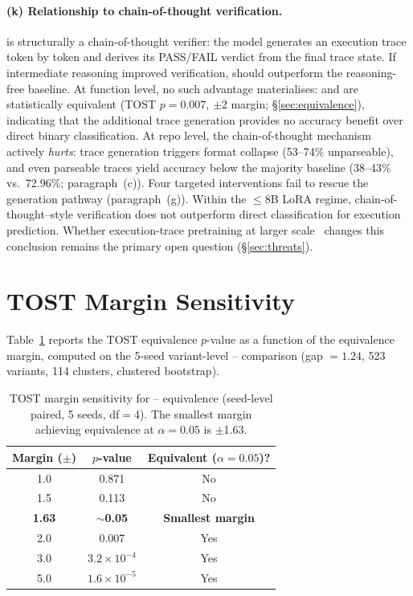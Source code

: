 \paragraph{(k) Relationship to chain-of-thought verification.}
\cwm{} is structurally a chain-of-thought verifier: the model generates an execution trace token by token and derives its PASS/FAIL verdict from the final trace state. If intermediate reasoning improved verification, \cwm{} should outperform the reasoning-free \cls{} baseline. At function level, no such advantage materialises: \cwm{} and \cls{} are statistically equivalent (TOST $p{=}0.007$, $\pm$2\pp{} margin; \S\ref{sec:equivalence}), indicating that the additional trace generation provides no accuracy benefit over direct binary classification. At repo level, the chain-of-thought mechanism actively \emph{hurts}: trace generation triggers format collapse (53--74\% unparseable), and even parseable traces yield accuracy below the majority baseline (38--43\% vs.\ 72.96\%; paragraph~(c)). Four targeted interventions fail to rescue the generation pathway (paragraph~(g)). Within the ${\leq}$8B LoRA regime, chain-of-thought--style verification does not outperform direct classification for execution prediction. Whether execution-trace pretraining at larger scale~\cite{meta2025cwm} changes this conclusion remains the primary open question (\S\ref{sec:threats}).

\section{TOST Margin Sensitivity}
\label{app:tost_sensitivity}

Table~\ref{tab:tost_sensitivity} reports the TOST equivalence $p$-value as a function of the equivalence margin, computed on the 5-seed variant-level \cls{}--\cwm{} comparison (gap $= 1.24$\pp{}, 523 variants, 114 clusters, clustered bootstrap).

\begin{table}[h]
\centering
\small
\caption{TOST margin sensitivity for \cls{}--\cwm{} equivalence (seed-level paired, 5 seeds, df${=}$4). The smallest margin achieving equivalence at $\alpha = 0.05$ is $\pm$1.63\pp{}.}
\label{tab:tost_sensitivity}
\setlength{\tabcolsep}{4pt}
\begin{tabular}{ccc}
\toprule
\textbf{Margin ($\pm$\pp{})} & \textbf{$p$-value} & \textbf{Equivalent ($\alpha{=}0.05$)?} \\
\midrule
1.0 & 0.871 & No \\
1.5 & 0.113 & No \\
\textbf{1.63} & ${\sim}$\textbf{0.05} & \textbf{Smallest margin} \\
2.0 & 0.007 & Yes \\
3.0 & $3.2{\times}10^{-4}$ & Yes \\
5.0 & $1.6{\times}10^{-5}$ & Yes \\
\bottomrule
\end{tabular}
\end{table}

